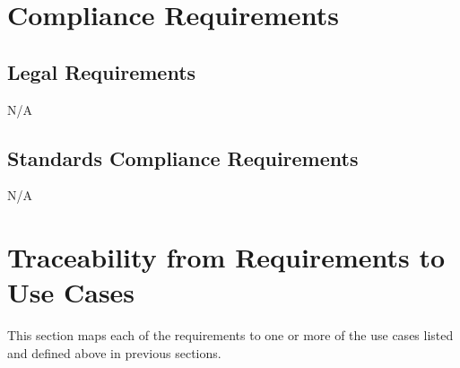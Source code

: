 \documentclass[12pt]{article}
\begin{document}
\section{Compliance Requirements}
\subsection{Legal Requirements}
N/A

\subsection{Standards Compliance Requirements}
N/A

\section{Traceability from Requirements to Use Cases}
This section maps each of the requirements to one or more of the use cases listed and defined above in previous sections.
\end{document}
